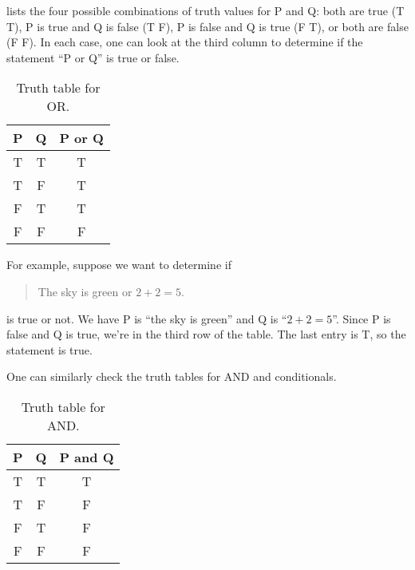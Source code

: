 \documentclass{tufte-book}
\begin{document}
 lists the four possible combinations of truth values for P and Q: both are true (T T), P is true and Q is false (T F), P is false and Q is true (F T), or both are false (F F). In each case, one can look at the third column to determine if the statement ``P or Q'' is true or false.
\begin{table}
  \begin{center}
    \begin{tabular}{ccc}
      \toprule
      P & Q & P or Q \\ \midrule
      T & T & T \\
      T & F & T \\
      F & T & T \\
      F & F & F \\ \bottomrule
    \end{tabular}
  \end{center}
  \caption{Truth table for OR.}
  \label{tab:truth-table-or}
\end{table}

For example, suppose we want to determine if 
\begin{quote}
  The sky is green or $2 + 2 = 5$.
\end{quote}
is true or not. We have P is ``the sky is green'' and Q is ``$2 + 2 = 5$''. Since P is false and Q is true, we're in the third row of the table. The last entry is T, so the statement is true.

One can similarly check the truth tables for AND and conditionals.

\begin{table}
  \centering
  \begin{tabular}{ccc}
    \toprule
    P & Q & P and Q \\ \midrule
    T & T & T \\
    T & F & F \\
    F & T & F \\
    F & F & F \\ \bottomrule
  \end{tabular}
  \caption{Truth table for AND.}
  \label{tab:truth-table-and}
\end{table}
\end{document}
